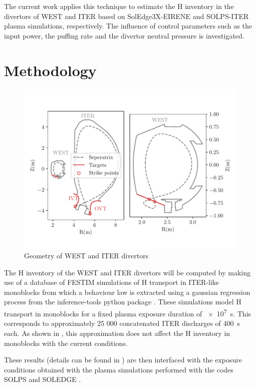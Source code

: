 The current work applies this technique to estimate the H inventory in the divertors of WEST and ITER based on SolEdge3X-EIRENE  and SOLPS-ITER  plasma simulations, respectively.
The influence of control parameters such as the input power, the puffing rate and the divertor neutral pressure is investigated.


\section{Methodology}
\begin{figure}[h!]
    \centering
    \includegraphics[width=0.95\linewidth]{Figures/divertor/coordinates.pdf}
    \caption{Geometry of WEST and ITER divertors}
    \label{fig: reactors}
\end{figure}

The H inventory of the WEST and ITER divertors will be computed by making use of a database of FESTIM simulations of H transport in ITER-like monoblocks from which a behaviour law is extracted using a gaussian regression process from the inference-tools python package .
These simulations model H transport in monoblocks for a fixed plasma exposure duration of \SI{e7}{s}.
This corresponds to approximately 25 000 concatenated ITER discharges of \SI{400}{s} each.
As shown in , this approximation does not affect the H inventory in monoblocks with the current conditions.

These results (details can be found in ) are then interfaced with the exposure conditions obtained with the plasma simulations performed with the codes SOLPS  and SOLEDGE .


